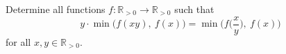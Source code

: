 Determine all functions $f\colon \mathbb{R}_{>0} \rightarrow \mathbb{R}_{>0}$ such that
$$y\cdot \min\!\Big(f(xy),\ f(x)\Big) = \min\!\Big(f\Big(\frac{x}{y}\Big),\ f(x)\Big)$$
for all $x,y\in \mathbb{R}_{>0}$.
